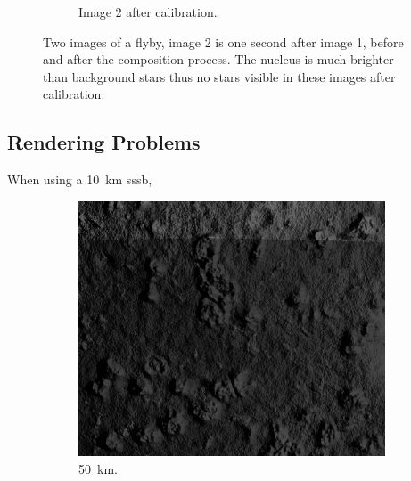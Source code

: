 \begin{figure}[htb]
\begin{subfigure}[b]{0.48\textwidth}
                \caption{Image 2 after calibration.}
                \label{fig:composition_after_2}
        \end{subfigure}
        \caption{Two images of a flyby, image 2 is one second after image 1, before and after the composition process. The nucleus is much brighter than background stars thus no stars visible in these images after calibration.}
        \label{fig:composition_before_after}
\end{figure}


\subsection{Rendering Problems}
When using a \SI{10}{\kilo\meter} \gls{sssb}, 
\begin{figure}[htb]
    \centering
        \begin{subfigure}[b]{0.32\textwidth}
            \centering
            \includegraphics[width=\textwidth]{doc/thesis/0_figures/rendering_artefacts/50_10_SssbOnly_2017-08-15T115845-190000.jpg}
            \caption{\SI{50}{\kilo\meter}.}
            \label{fig:render_artefacts_50}
        \end{subfigure}
        \begin{subfigure}[b]{0.32\textwidth}
            \centering

\end{subfigure}
\end{figure}
